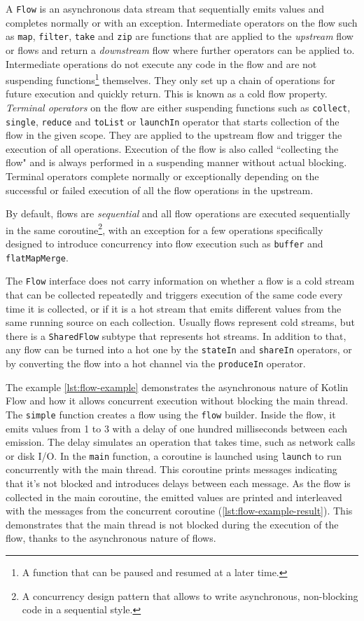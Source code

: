 \documentclass[12pt,a4paper,openright,twoside]{book}
\begin{document}
A \texttt{Flow} is an asynchronous data stream that sequentially emits values and completes normally or with an exception. Intermediate operators on the flow such as \texttt{map}, \texttt{filter}, \texttt{take} and \texttt{zip} are functions that are applied to the \textit{upstream} flow or flows and return a \textit{downstream} flow where further operators can be applied to. Intermediate operations do not execute any code in the flow and are not suspending functions\footnote{A function that can be paused and resumed at a later time.} themselves. They only set up a chain of operations for future execution and quickly return. This is known as a cold flow property. \textit{Terminal operators} on the flow are either suspending functions such as \texttt{collect}, \texttt{single}, \texttt{reduce} and \texttt{toList} or \texttt{launchIn} operator that starts collection of the flow in the given scope. They are applied to the upstream flow and trigger the execution of all operations. Execution of the flow is also called ``collecting the flow" and is always performed in a suspending manner without actual blocking. Terminal operators complete normally or exceptionally depending on the successful or failed execution of all the flow operations in the upstream.

By default, flows are \textit{sequential} and all flow operations are executed sequentially in the same coroutine\footnote{A concurrency design pattern that allows to write asynchronous, non-blocking code in a sequential style.}, with an exception for a few operations specifically designed to introduce concurrency into flow execution such as \texttt{buffer} and \texttt{flatMapMerge}.

The \texttt{Flow} interface does not carry information on whether a flow is a cold stream that can be collected repeatedly and triggers execution of the same code every time it is collected, or if it is a hot stream that emits different values from the same running source on each collection. Usually flows represent cold streams, but there is a \texttt{SharedFlow} subtype that represents hot streams. In addition to that, any flow can be turned into a hot one by the \texttt{stateIn} and \texttt{shareIn} operators, or by converting the flow into a hot channel via the \texttt{produceIn} operator.

The example \cref{lst:flow-example} demonstrates the asynchronous nature of Kotlin Flow and how it allows concurrent execution without blocking the main thread. The \texttt{simple} function creates a flow using the \texttt{flow} builder. Inside the flow, it emits values from 1 to 3 with a delay of one hundred milliseconds between each emission. The delay simulates an operation that takes time, such as network calls or disk I/O. In the \texttt{main} function, a coroutine is launched using \texttt{launch} to run concurrently with the main thread. This coroutine prints messages indicating that it's not blocked and introduces delays between each message. As the flow is collected in the main coroutine, the emitted values are printed and interleaved with the messages from the concurrent coroutine (\cref{lst:flow-example-result}). This demonstrates that the main thread is not blocked during the execution of the flow, thanks to the asynchronous nature of flows.
\end{document}
